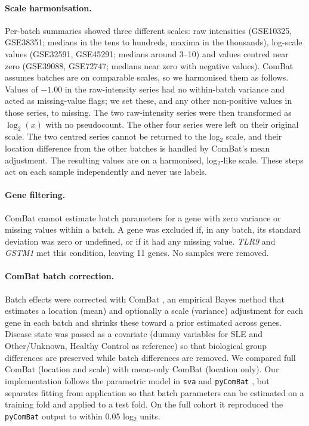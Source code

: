 \documentclass[11pt]{article}
\begin{document}
\paragraph{Scale harmonisation.} Per-batch summaries showed three different scales: raw intensities (GSE10325, GSE38351; medians in the tens to hundreds, maxima in the thousands), log-scale values (GSE32591, GSE45291; medians around 3--10) and values centred near zero (GSE39088, GSE72747; medians near zero with negative values). ComBat assumes batches are on comparable scales, so we harmonised them as follows. Values of $-1.00$ in the raw-intensity series had no within-batch variance and acted as missing-value flags; we set these, and any other non-positive values in those series, to missing. The two raw-intensity series were then transformed as $\log_2(x)$ with no pseudocount. The other four series were left on their original scale. The two centred series cannot be returned to the log$_2$ scale, and their location difference from the other batches is handled by ComBat's mean adjustment. The resulting values are on a harmonised, log$_2$-like scale. These steps act on each sample independently and never use labels.

\paragraph{Gene filtering.} ComBat cannot estimate batch parameters for a gene with zero variance or missing values within a batch. A gene was excluded if, in any batch, its standard deviation was zero or undefined, or if it had any missing value. \textit{TLR9} and \textit{GSTM1} met this condition, leaving 11 genes. No samples were removed.

\paragraph{ComBat batch correction.} Batch effects were corrected with ComBat \citep{johnson2007,leek2012}, an empirical Bayes method that estimates a location (mean) and optionally a scale (variance) adjustment for each gene in each batch and shrinks these toward a prior estimated across genes. Disease state was passed as a covariate (dummy variables for SLE and Other/Unknown, Healthy Control as reference) so that biological group differences are preserved while batch differences are removed. We compared full ComBat (location and scale) with mean-only ComBat (location only). Our implementation follows the parametric model in \texttt{sva} and \texttt{pyComBat} \citep{behdenna2023}, but separates fitting from application so that batch parameters can be estimated on a training fold and applied to a test fold. On the full cohort it reproduced the \texttt{pyComBat} output to within 0.05 log$_2$ units.
\end{document}
